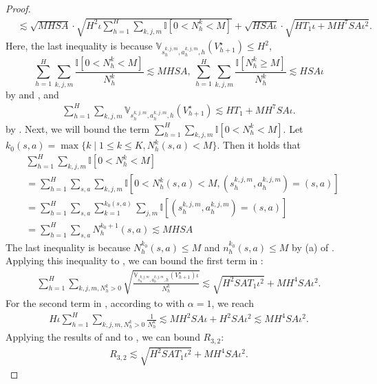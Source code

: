 \documentclass{article}
\begin{document}
\begin{proof}
\begin{align}
    & \lesssim \sqrt{MHSA}\cdot \sqrt{H^2\iota\sum_{h=1}^H\sum_{k,j,m}\mathbb{I}\left[0<N_h^k< M\right]} + \sqrt{HSA\iota}\cdot \sqrt{HT_1\iota + MH^7SA\iota^2}.
    \end{align}
    Here, the last inequality is because $\mathbb{V}_{s_h^{k,j,m}, a_h^{k,j,m},h}(V_{h+1}^{\star}) \leq H^2$,
    \begin{equation*}
        \sum_{h=1}^H\sum_{k,j,m}\frac{\mathbb{I}\left[0<N_h^k< M\right]}{N_h^k} \lesssim MHSA,\ \sum_{h=1}^H\sum_{k,j,m}\frac{\mathbb{I}\left[N_h^k\geq M\right]}{N_h^k}  \lesssim HSA\iota
    \end{equation*}
    by  and ,
    and
    \begin{align*}
        \sum_{h=1}^H\sum_{k,j,m}\mathbb{V}_{s_h^{k,j,m}, a_h^{k,j,m}, h} (V_{h+1}^{\star}) \lesssim HT_1 + MH^7SA\iota.
    \end{align*}
    by . Next, we will bound the term $\sum_{h=1}^H\sum_{k,j,m}\mathbb{I}\left[0<N_h^k< M\right]$.
    Let  $k_0(s,a) = \max \{k \mid 1 \leq k\leq K, N_h^k(s,a) < M\}$. Then it holds that
    \begin{align}
    \label{sumn0}
    &\sum_{h=1}^H\sum_{k,j,m}\mathbb{I}\left[0<N_h^k < M\right] \nonumber\\
    &= \sum_{h=1}^H\sum_{s,a}\sum_{k,j,m}\mathbb{I}\left[0<N_h^k(s,a) <M, (s_h^{k,j,m}, a_h^{k,j,m})=(s,a)\right] \nonumber\\     &=\sum_{h=1}^H\sum_{s,a}\sum_{k=1}^{k_0(s,a)}\sum_{j,m}\mathbb{I}\left[(s_h^{k,j,m}, a_h^{k,j,m})=(s,a)\right] \nonumber\\
        &=\sum_{h=1}^H\sum_{s,a}N_h^{k_0+1}(s,a)  \lesssim MHSA
    \end{align}
    The last inequality is because $N_h^{k_0}(s,a) \leq M$ and $n_h^{k_0}(s,a) \leq M$ by (a) of . Applying this inequality to , we can bound the first term in :
    \begin{align}
        \label{r321begin}
        \sum_{h=1}^H \sum_{k,j,m,N_h^k >0} \sqrt{\frac{\mathbb{V}_{s_h^{k,j,m}, a_h^{k,j,m},h}(V_{h+1}^{\star})\iota}{N_h^k}} \lesssim \sqrt{H^2SAT_1\iota^2} + MH^4SA\iota^2. 
    \end{align}
     For the second term in , according to  with $\alpha = 1$, we reach
    \begin{align}
        \label{r322begin}
         H\iota\sum_{h=1}^H \sum_{k,j,m,N_h^k >0}\frac{1}{N_h^k}\lesssim MH^2SA\iota + H^2SA\iota^2 \lesssim MH^4SA\iota^2.
    \end{align}
    Applying the results of  and  to , we can bound $R_{3,2}$:
    \begin{align}
        \label{upperr32}
        R_{3,2} \lesssim \sqrt{H^2SAT_1\iota^2} + MH^4SA\iota^2.
    \end{align}


\end{proof}
\end{document}
